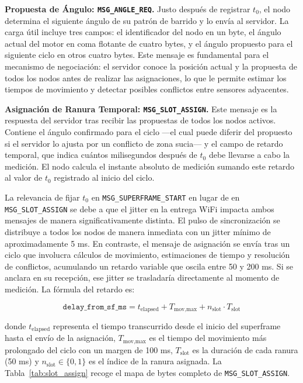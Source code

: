 \textbf{Propuesta de Ángulo: \texttt{MSG\_ANGLE\_REQ}.} Justo después de registrar $t_0$, el nodo determina el siguiente ángulo de su patrón de barrido y lo envía al servidor. La carga útil incluye tres campos: el identificador del nodo en un byte, el ángulo actual del motor en coma flotante de cuatro bytes, y el ángulo propuesto para el siguiente ciclo en otros cuatro bytes. Este mensaje es fundamental para el mecanismo de negociación: el servidor conoce la posición actual y la propuesta de todos los nodos antes de realizar las asignaciones, lo que le permite estimar los tiempos de movimiento y detectar posibles conflictos entre sensores adyacentes.

\textbf{Asignación de Ranura Temporal: \texttt{MSG\_SLOT\_ASSIGN}.} Este mensaje es la respuesta del servidor tras recibir las propuestas de todos los nodos activos. Contiene el ángulo confirmado para el ciclo ---el cual puede diferir del propuesto si el servidor lo ajusta por un conflicto de zona sucia--- y el campo de retardo temporal, que indica cuántos milisegundos después de $t_0$ debe llevarse a cabo la medición. El nodo calcula el instante absoluto de medición sumando este retardo al valor de $t_0$ registrado al inicio del ciclo.

La relevancia de fijar $t_0$ en \texttt{MSG\_SUPERFRAME\_START} en lugar de en \texttt{MSG\_SLOT\_ASSIGN} se debe a que el jitter en la entrega WiFi impacta ambos mensajes de manera significativamente distinta. El pulso de sincronización se distribuye a todos los nodos de manera inmediata con un jitter mínimo de aproximadamente 5 ms. En contraste, el mensaje de asignación se envía tras un ciclo que involucra cálculos de movimiento, estimaciones de tiempo y resolución de conflictos, acumulando un retardo variable que oscila entre 50 y 200 ms. Si se anclara en su recepción, ese jitter se trasladaría directamente al momento de medición. La fórmula del retardo es:

\begin{equation}
\texttt{delay\_from\_sf\_ms} = t_{\text{elapsed}} + T_{\text{mov,max}} + n_{\text{slot}} \cdot T_{\text{slot}}
\label{eq:delay}
\end{equation}

donde $t_{\text{elapsed}}$ representa el tiempo transcurrido desde el inicio del superframe hasta el envío de la asignación, $T_{\text{mov,max}}$ es el tiempo del movimiento más prolongado del ciclo con un margen de 100 ms, $T_{\text{slot}}$ es la duración de cada ranura (50 ms) y $n_{\text{slot}} \in \{0, 1\}$ es el índice de la ranura asignada. La Tabla~\ref{tab:slot_assign} recoge el mapa de bytes completo de \texttt{MSG\_SLOT\_ASSIGN}.

